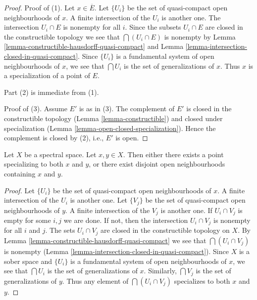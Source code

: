 \begin{proof}
Proof of (1). Let $x \in \overline{E}$. Let $\{U_i\}$ be the set of
quasi-compact open neighbourhoods of $x$. A finite intersection of the
$U_i$ is another one. The intersection $U_i \cap E$ is nonempty for all
$i$. Since the subsets $U_i \cap E$ are closed in the constructible topology
we see that $\bigcap (U_i \cap E)$ is nonempty by
Lemma \ref{lemma-constructible-hausdorff-quasi-compact} and
Lemma \ref{lemma-intersection-closed-in-quasi-compact}.
Since $\{U_i\}$ is a
fundamental system of open neighbourhoods of $x$, we see that
$\bigcap U_i$ is the set of generalizations of $x$. Thus
$x$ is a specialization of a point of $E$.

\medskip\noindent
Part (2) is immediate from (1).

\medskip\noindent
Proof of (3). Assume $E'$ is as in (3). The complement of $E'$ is closed
in the constructible topology (Lemma \ref{lemma-constructible})
and closed under specialization
(Lemma \ref{lemma-open-closed-specialization}).
Hence the complement is closed by (2), i.e., $E'$ is open.
\end{proof}

\begin{lemma}
\label{lemma-two-points}
Let $X$ be a spectral space. Let $x, y \in X$. Then either there exists
a point specializing to both $x$ and $y$, or there exist disjoint
open neighbourhoods containing $x$ and $y$.
\end{lemma}

\begin{proof}
Let $\{U_i\}$ be the set of quasi-compact open neighbourhoods of $x$.
A finite intersection of the $U_i$ is another one.
Let $\{V_j\}$ be the set of quasi-compact open neighbourhoods of $y$.
A finite intersection of the $V_j$ is another one.
If $U_i \cap V_j$ is empty for some $i, j$ we are done.
If not, then the intersection $U_i \cap V_j$ is nonempty
for all $i$ and $j$. The sets $U_i \cap V_j$ are closed in the constructible
topology on $X$. By
Lemma \ref{lemma-constructible-hausdorff-quasi-compact}
we see that $\bigcap (U_i \cap V_j)$ is nonempty
(Lemma \ref{lemma-intersection-closed-in-quasi-compact}).
Since $X$ is a sober space and $\{U_i\}$ is a
fundamental system of open neighbourhoods of $x$, we see that
$\bigcap U_i$ is the set of generalizations of $x$.
Similarly, $\bigcap V_j$ is the set of generalizations of $y$.
Thus any element of $\bigcap (U_i \cap V_j)$ specializes to both
$x$ and $y$.
\end{proof}


